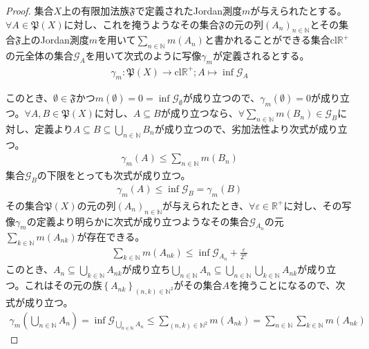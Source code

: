 \documentclass[dvipdfmx]{jsarticle}
\begin{document}
\begin{proof}
集合$X$上の有限加法族$\mathfrak{F}$で定義されたJordan測度$m$が与えられたとする。$\forall A \in \mathfrak{P}(X)$に対し、これを掩うようなその集合$\mathfrak{F}$の元の列$\left( A_{n} \right)_{n \in \mathbb{N}}$とその集合$\mathfrak{F}$上のJordan測度$m$を用いて$\sum_{n \in \mathbb{N}} {m\left( A_{n} \right)}$と書かれることができる集合$\mathrm{cl}\mathbb{R}^{+}$の元全体の集合$\mathcal{G}_{A}$を用いて次式のように写像$\gamma_{m}$が定義されるとする。
\begin{align*}
\gamma_{m}\mathfrak{:P}(X) \rightarrow \mathrm{cl}\mathbb{R}^{+};A \mapsto \inf\mathcal{G}_{A}
\end{align*}\par
このとき、$\mathfrak{\emptyset \in F}$かつ$m(\emptyset) = 0 = \inf\mathcal{G}_{\emptyset}$が成り立つので、$\gamma_{m}(\emptyset) = 0$が成り立つ。$\forall A,B \in \mathfrak{P}(X)$に対し、$A \subseteq B$が成り立つなら、$\forall\sum_{n \in \mathbb{N}} {m\left( B_{n} \right)} \in \mathcal{G}_{B}$に対し、定義より$A \subseteq B \subseteq \bigcup_{n \in \mathbb{N}} B_{n}$が成り立つので、劣加法性より次式が成り立つ。
\begin{align*}
\gamma_{m}(A) \leq \sum_{n \in \mathbb{N}} {m\left( B_{n} \right)}
\end{align*}
集合$\mathcal{G}_{B}$の下限をとっても次式が成り立つ。
\begin{align*}
\gamma_{m}(A) \leq \inf\mathcal{G}_{B} = \gamma_{m}(B)
\end{align*}
その集合$\mathfrak{P}(X)$の元の列$\left( A_{n} \right)_{n \in \mathbb{N}}$が与えられたとき、$\forall\varepsilon \in \mathbb{R}^{+}$に対し、その写像$\gamma_{m}$の定義より明らかに次式が成り立つようなその集合$\mathcal{G}_{A_{n}}$の元$\sum_{k \in \mathbb{N}} {m\left( A_{nk} \right)}$が存在できる。
\begin{align*}
\sum_{k \in \mathbb{N}} {m\left( A_{nk} \right)} \leq \inf\mathcal{G}_{A_{n}} + \frac{\varepsilon}{2^{n}}
\end{align*}
このとき、$A_{n} \subseteq \bigcup_{k \in \mathbb{N}} A_{nk}$が成り立ち$\bigcup_{n \in \mathbb{N}} A_{n} \subseteq \bigcup_{n \in \mathbb{N}} {\bigcup_{k \in \mathbb{N}} A_{nk}}$が成り立つ。これはその元の族$\left\{ A_{nk} \right\}_{(n,k) \in \mathbb{N}^{2}}$がその集合$A$を掩うことになるので、次式が成り立つ。
\begin{align*}
\gamma_{m}\left( \bigcup_{n \in \mathbb{N}} A_{n} \right) = \inf\mathcal{G}_{\bigcup_{n \in \mathbb{N}} A_{n}} \leq \sum_{(n,k) \in \mathbb{N}^{2}} {m\left( A_{nk} \right)} = \sum_{n \in \mathbb{N}} {\sum_{k \in \mathbb{N}} {m\left( A_{nk} \right)}}

\end{align*}
\end{proof}
\end{document}
